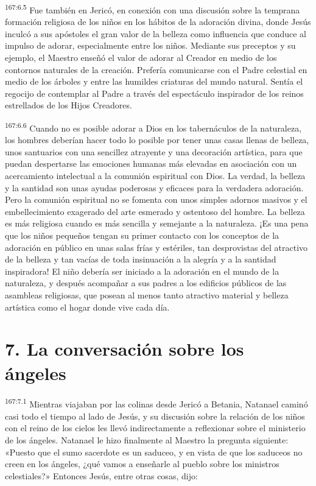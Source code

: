 \par 
\textsuperscript{167:6.5} Fue también en Jericó, en conexión con una discusión sobre la temprana formación religiosa de los niños en los hábitos de la adoración divina, donde Jesús inculcó a sus apóstoles el gran valor de la belleza como influencia que conduce al impulso de adorar, especialmente entre los niños. Mediante sus preceptos y su ejemplo, el Maestro enseñó el valor de adorar al Creador en medio de los contornos naturales de la creación. Prefería comunicarse con el Padre celestial en medio de los árboles y entre las humildes criaturas del mundo natural. Sentía el regocijo de contemplar al Padre a través del espectáculo inspirador de los reinos estrellados de los Hijos Creadores.

\par 
\textsuperscript{167:6.6} Cuando no es posible adorar a Dios en los tabernáculos de la naturaleza, los hombres deberían hacer todo lo posible por tener unas casas llenas de belleza, unos santuarios con una sencillez atrayente y una decoración artística, para que puedan despertarse las emociones humanas más elevadas en asociación con un acercamiento intelectual a la comunión espiritual con Dios. La verdad, la belleza y la santidad son unas ayudas poderosas y eficaces para la verdadera adoración. Pero la comunión espiritual no se fomenta con unos simples adornos masivos y el embellecimiento exagerado del arte esmerado y ostentoso del hombre. La belleza es más religiosa cuando es más sencilla y semejante a la naturaleza. ¡Es una pena que los niños pequeños tengan su primer contacto con los conceptos de la adoración en público en unas salas frías y estériles, tan desprovistas del atractivo de la belleza y tan vacías de toda insinuación a la alegría y a la santidad inspiradora! El niño debería ser iniciado a la adoración en el mundo de la naturaleza, y después acompañar a sus padres a los edificios públicos de las asambleas religiosas, que posean al menos tanto atractivo material y belleza artística como el hogar donde vive cada día.

\section*{7. La conversación sobre los ángeles}
\par 
\textsuperscript{167:7.1} Mientras viajaban por las colinas desde Jericó a Betania, Natanael caminó casi todo el tiempo al lado de Jesús, y su discusión sobre la relación de los niños con el reino de los cielos les llevó indirectamente a reflexionar sobre el ministerio de los ángeles. Natanael le hizo finalmente al Maestro la pregunta siguiente: «Puesto que el sumo sacerdote es un saduceo, y en vista de que los saduceos no creen en los ángeles, ¿qué vamos a enseñarle al pueblo sobre los ministros celestiales?» Entonces Jesús, entre otras cosas, dijo:

